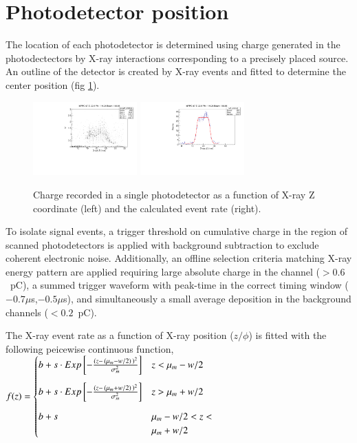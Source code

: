 \section{Photodetector position}\label{sec:mppcposition}
The location of each photodetector is determined using charge
generated in the photodectectors by X-ray interactions corresponding
to a precisely placed source.  An outline of the detector is created
by X-ray events and fitted to determine the center position (fig
\ref{fig:xrayevents}). 

\begin{figure}[h]
  \includegraphics[width=4cm]{plots/2018/hcharge67_z}
  \includegraphics[width=4cm]{plots/2018/mppc_fit}
  \caption{Charge recorded in a single photodetector as a function of X-ray Z coordinate 
  (left) and 
    the calculated event rate (right).}
  \label{fig:xrayevents}
\end{figure}  

To isolate signal events, a trigger threshold on cumulative charge 
in the region of scanned photodetectors is applied with background 
subtraction to exclude coherent electronic noise. Additionally, 
an offline selection criteria matching X-ray energy pattern are applied
requiring large absolute charge in the channel 
($>0.6$~pC), a summed trigger waveform with peak-time in the correct timing window ($-0.7\mu$s,$-0.5\mu$s), and simultaneously a small average deposition 
in the background channels ($<0.2$~pC).

The X-ray event rate as a function of X-ray position ($z/\phi$) is
fitted with the following peicewise continuous function,\\
\begin{math}\label{eqn:mppcfitfcn}
f(z) = 
\begin{cases}
   b+s\cdot 
Exp\left[-\frac{(z - \, (\mu_m - w/2)\,)^2}{\sigma_m^2}\right] & z <
\mu_m-w/2  \vspace{3mm} \\
   b+s\cdot 
Exp\left[-\frac{(z - \, (\mu_m + w/2)\, )^2}{\sigma_m^2}\right] & z >
\mu_m+w/2    \vspace{3mm} \\
   b+s                                         & \mu_m - w/2 < z < \\
                                               & \mu_m + w/2    \\
\end{cases}
\end{math}

